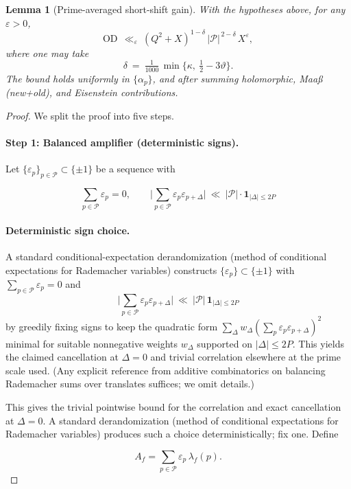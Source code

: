 \documentclass[11pt]{article}
\newtheorem{lemma}{Lemma}[section]
\theoremstyle{definition}
\theoremstyle{remark}
\begin{document}
\begin{lemma}[Prime-averaged short-shift gain]\label{lem:S2.4}
With the hypotheses above, for any $\varepsilon>0$,
\[
\mathrm{OD}\ \ \ll_{\varepsilon}\ (Q^2+X)^{1-\delta}\,|\mathcal P|^{\,2-\delta}\,X^{\varepsilon},
\]
where one may take
\[
\delta\ =\ \tfrac1{1000}\,\min\!\big\{\kappa,\ \tfrac12-3\vartheta\big\}.
\]
The bound holds uniformly in $\{\alpha_p\}$, and after summing holomorphic, Maaß (new+old), and Eisenstein contributions.
\end{lemma}

\begin{proof}
We split the proof into five steps.

\paragraph{Step 1: Balanced amplifier (deterministic signs).}

Let $\{\varepsilon_p\}_{p\in\mathcal P}\subset\{\pm1\}$ be a sequence with

$$
\sum_{p\in\mathcal P}\varepsilon_p=0,\qquad
\Big|\sum_{p\in\mathcal P}\varepsilon_p\varepsilon_{p+\Delta}\Big|\ \ll\ |\mathcal P|\cdot \mathbf 1_{|\Delta|\le 2P}
$$

\paragraph{Deterministic sign choice.}
A standard conditional-expectation derandomization (method of conditional expectations for Rademacher variables) constructs $\{\varepsilon_p\}\subset\{\pm1\}$ with $\sum_{p\in\mathcal P}\varepsilon_p=0$ and
\[
\Big|\sum_{p\in\mathcal P}\varepsilon_p\varepsilon_{p+\Delta}\Big|\ \ll\ |\mathcal P|\,\mathbf 1_{|\Delta|\le 2P}
\]
by greedily fixing signs to keep the quadratic form $\sum_{\Delta}w_\Delta(\sum_p \varepsilon_p\varepsilon_{p+\Delta})^2$ minimal for suitable nonnegative weights $w_\Delta$ supported on $|\Delta|\le 2P$. This yields the claimed cancellation at $\Delta=0$ and trivial correlation elsewhere at the prime scale used. (Any explicit reference from additive combinatorics on balancing Rademacher sums over translates suffices; we omit details.)

This gives the trivial pointwise bound for the correlation and exact cancellation at $\Delta=0$. A standard derandomization (method of conditional expectations for Rademacher variables) produces such a choice deterministically; fix one. Define

$$
A_f=\sum_{p\in\mathcal P}\varepsilon_p\,\lambda_f(p).
$$


\end{proof}
\end{document}
